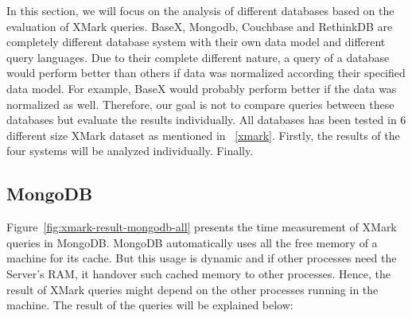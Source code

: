 In this section, we will focus on the analysis of different databases based on the  evaluation of XMark queries. BaseX, Mongodb, Couchbase and RethinkDB are completely different database system  with their own data model and different query languages.  Due to their complete different nature, a query of a database would perform better than others if data was normalized according their specified data model. For example, BaseX would probably perform better if the data was normalized as well. Therefore, our goal is not to compare queries between these databases but evaluate the results individually.  All databases has been tested in 6 different size XMark dataset as mentioned in ~\ref{xmark}. Firstly, the results  of the four systems will be analyzed individually. Finally.

\subsection{MongoDB}
Figure~\ref{fig:xmark-result-mongodb-all} presents the time measurement of XMark queries in MongoDB. MongoDB automatically uses all the free memory of a machine for its cache. But this usage is dynamic and if other processes need the Server's RAM, it handover such cached memory to other processes. Hence, the result of XMark queries might depend on the other processes running in the machine.  The result of the queries will be explained below:
